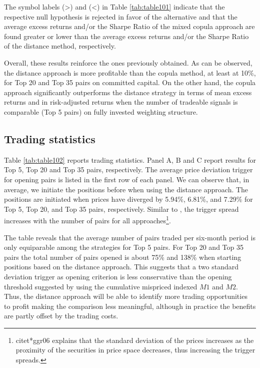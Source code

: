 \documentclass[a4paper]{article}
\begin{document}

The symbol labels (>) and (<) in Table \ref{tab:table101} indicate that the respective null hypothesis is rejected in favor of the alternative and that the average excess returns and/or the Sharpe Ratio of the mixed copula approach are found greater or lower than the average excess returns and/or the Sharpe Ratio of the distance method, respectively.

Overall, these results reinforce the ones previously obtained. As can be observed, the distance approach is more profitable than the copula method, at least at 10\%, for Top 20 and Top 35 pairs on committed capital. On the other hand, the copula approach significantly outperforms the distance strategy in terms of mean excess returns and in risk-adjusted returns when the number of tradeable signals is comparable (Top 5 pairs) on fully invested weighting structure.


\vspace{1.0cm}


	
	\subsection{Trading statistics}
	
	Table \ref{tab:table102} reports trading statistics. Panel A, B and C report results for Top 5, Top 20 and Top 35 pairs, respectively. The average price deviation trigger for opening pairs is listed in the first row of each panel. We can observe that, in average, we initiate the positions before when using the distance approach. The positions are initiated when prices have diverged by 5.94\%, 6.81\%, and 7.29\% for Top 5, Top 20, and Top 35 pairs, respectively. Similar to \citet*{ggr06}, the trigger spread increases with the number of pairs for all approaches\footnote{citet*{ggr06} explains that the standard deviation of the prices increases as the proximity of the securities in price space decreases, thus increasing the trigger spreads.}.
	
	The table reveals that the average number of pairs traded per six-month period is only equiparable among the strategies for Top 5 pairs. For Top 20 and Top 35 pairs the total number of pairs opened is about 75\% and 138\% when starting positions based on the distance approach. This suggests that a two standard deviation trigger as opening criterion is less conservative than the opening threshold suggested by \citet*{rf15} using the cumulative mispriced indexed $M1$ and $M2$. Thus, the distance approach will be able to identify more trading opportunities to profit making the comparison less meaningful, although in practice the benefits are partly offset by the trading costs.
	
\end{document}
